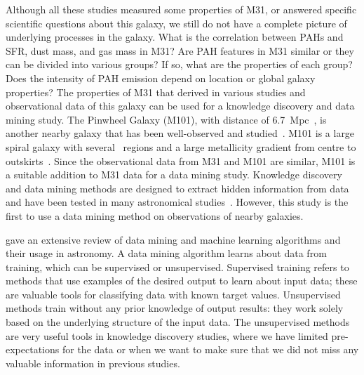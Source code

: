Although all these studies measured some properties of M31, or answered specific scientific questions about this galaxy, we still do not have a complete picture of underlying processes in the galaxy.
What is the correlation between PAHs and SFR, dust mass, and gas mass in M31? 
Are PAH features in M31 similar or they can be divided into various groups? If so, what are the properties of each group?
Does the intensity of PAH emission depend on location or global galaxy properties? 
The properties of M31 that derived in various studies and observational data of this galaxy can be used for a knowledge discovery and data mining study.
The Pinwheel Galaxy (M101), with distance of 6.7~Mpc~\citep{Freedman01}, is another nearby galaxy that has been well-observed and studied~\citep[e.g. ][and references therein]{Kennicutt11,Dale09, Leroy08, Gordon08}.
M101 is a large spiral galaxy with several \hii~regions and a large metallicity gradient from centre to outskirts~\citep{Kennicutt03}.
Since the observational data from M31 and M101 are similar, M101 is a suitable addition to M31 data for a data mining study. 
Knowledge discovery and data mining methods are designed to extract hidden information from data and have been tested in many astronomical studies~\citep[e.g.][and references therein]{Ball10}.
However, this study is the first to use a data mining method on observations of nearby galaxies.

\cite{Ball10} gave an extensive review of data mining and machine learning algorithms and their usage in astronomy.
A data mining algorithm learns about data from training, which can be supervised or unsupervised.
Supervised training refers to methods that use examples of the desired output to learn about input data; these are valuable tools for classifying data with known target values.
Unsupervised methods train without any prior knowledge of output results: 
they work solely based on the underlying structure of the input data.   
The unsupervised methods are very useful tools in knowledge discovery studies, where we have limited pre-expectations for the data or when we want to make sure that we did not miss any valuable information in previous studies.

